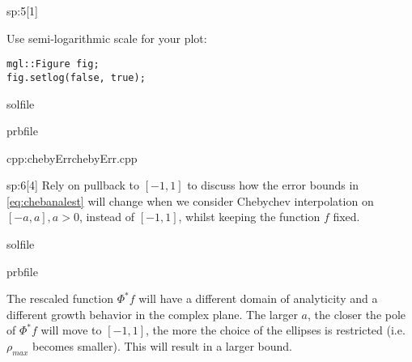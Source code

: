 \begin{samproblem}
\begin{subproblem}{sp:5}[1]
  \begin{samhint}
    Use semi-logarithmic scale for your plot:
    \begin{lstlisting}[style=cpp]
mgl::Figure fig;
fig.setlog(false, true);
    \end{lstlisting}
  \end{samhint}

  \begin{samwriteprbpart}{solfile}
    \begin{writeverbatim}{prbfile}
      \begin{samsolution}
        \begin{samcode}{cpp:chebyErr}{chebyErr.cpp}
          \small
          
        \end{samcode}
      \end{samsolution}
    \end{writeverbatim}
  \end{samwriteprbpart}

\end{subproblem}



\begin{subproblem}{sp:6}[4]
  Rely on pullback to $[-1,1]$ to discuss how the error bounds in \cref{eq:chebanalest} will change when we consider Chebychev interpolation on
 $[-a,a], a > 0$, instead of $[-1,1]$, whilst keeping the function $f$ fixed.
  
\iffalse
  \begin{samwriteprbpart}{solfile}
    \begin{writeverbatim}{prbfile}
      \begin{samsolution}
        The rescaled function $\Phi^{\ast}f$ will have a different domain of analyticity and a different growth behavior in the complex plane. 
        The larger $a$, the closer the pole of $\Phi^{\ast}f$ will move to $[-1,1]$, the more the choice of the ellipses is restricted 
        (i.e. $\rho_{max}$ becomes smaller). This will result in a larger bound.
   

\end{samsolution}
\end{writeverbatim}
\end{samwriteprbpart}
\end{subproblem}
\end{samproblem}

